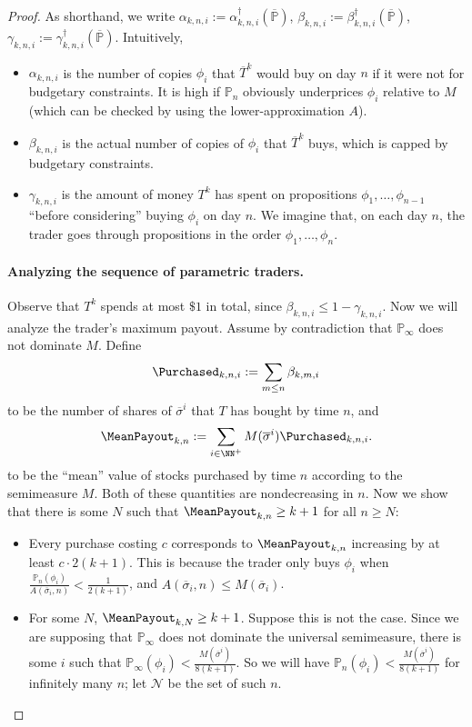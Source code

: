 \documentclass[authordate,onecolumn,noenvironments]{miri-tech-article}
\numberwithin{equation}{subsection}
\newcommand{\seq}[1]{{\overline{#1}}}
\newcommand{\nn}{n}
\newcommand{\trade}{T}%
\newcommand{\Trader}{\seq{\trade}} %
\newcommand{\gens}{\dagger}
\newcommand{\gen}[1]{{#1^\gens}}
\newcommand{\BelState}{\mathbb{P}}
\newcommand{\pt}{\BelState}
\newcommand{\MP}{\seq{\pt}}
\newcommand{\ftn}{(\MP)} %
\begin{document}
\begin{proof}
As shorthand, we write $\alpha_{k,n,i} := \gen{\alpha_{k,n,i}} \ftn$, $\beta_{k,n,i} := \gen{\beta_{k,n,i}} \ftn$, $\gamma_{k,n,i} := \gen{\gamma_{k,n,i}} \ftn$. Intuitively,
\begin{itemize}
  \item $\alpha_{k,n,i}$ is the number of copies $\phi_i$ that  $\Trader^k$ would buy on day $n$ if it were not for budgetary constraints.  It is high if $\pt_n$ obviously underprices
    $\phi_i$ relative to $M$ (which can be checked by using the lower-approximation $A$).
  \item $\beta_{k,n,i}$ is the actual number of copies of $\phi_i$ that $\Trader^k$ buys, which is capped by budgetary constraints.
  \item $\gamma_{k, n, i}$ is the amount of money $T^k$ has spent on propositions $\phi_1, \ldots, \phi_{n-1}$ ``before considering'' buying $\phi_i$ on day $n$.  We imagine that,
        on each day $n$, the trader goes through propositions in the order $\phi_1, \ldots, \phi_n$.
\end{itemize}

\paragraph{Analyzing the sequence of parametric traders.}

Observe that $T^k$ spends at most $\$1$ in total, since $\beta_{k,n,i} \leq 1 - \gamma_{k,n,i}$.  Now we will analyze the trader's maximum payout.  Assume by contradiction
that $\pt_\infty$ does not dominate $M$.  Define
\[ \Purchased_{k,n,i} := \sum_{m\le n} \beta_{k,m,i} \]
to be the number of shares of $\seq{\sigma}^i$ that $T$ has bought by time $\nn$, and
\[ \MeanPayout_{k,n} := \sum_{i \in \NN^+} M(\seq{\sigma}^i) \Purchased_{k,n,i}. \]
to be the ``mean'' value of stocks purchased by time $\nn$ according to the semimeasure $M$.  Both of these quantities are nondecreasing in $n$.  Now we show that there is some $N$ such that $\MeanPayout_{k,n} \geq k+1$ for all $n \geq N$:
\begin{itemize}
  \item Every purchase costing $c$ corresponds to $\MeanPayout_{k,n}$ increasing by at least $c\cdot 2(k+1)$.  This is because the trader only buys $\phi_i$ when $\frac{\pt_\nn(\phi_i)}{A(\seq{\sigma}_i, \nn)} < \frac{1}{2(k+1)}$, and $A(\seq{\sigma}_i, \nn) \leq M(\seq{\sigma}_i)$.
  \item For some $N$, $\MeanPayout_{k, N} \geq k+1$.  Suppose this is not the case.
Since we are supposing that $\pt_\infty$ does not dominate the universal semimeasure, there is some $i$ such that
$\pt_\infty(\phi_{i}) < \frac{M(\seq{\sigma}^{i})}{8(k + 1)}$.  So we will have
$\pt_n(\phi_{i}) < \frac{M(\seq{\sigma}^{i})}{8(k + 1)}$ for infinitely many $n$; let $\mathcal{N}$ be the set of such $n$.


\end{itemize}
\end{proof}
\end{document}
